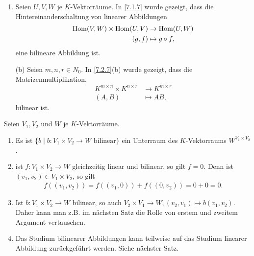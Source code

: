 \documentclass[../../main.tex]{subfiles}
\begin{document}
\begin{bsp}\label{13.2.3}
\begin{enumerate}[\normalfont(a)]
\item Seien $U,V,W$ je $K$-Vektorräume. In \ref{7.1.7} wurde gezeigt, dass die Hintereinanderschaltung von linearer Abbildungen
\begin{align*}
\operatorname{Hom}(V,W)\times \operatorname{Hom}(U,V)&\to\operatorname{Hom}(U,W)\\
(g,f)&\mapsto g\circ f,
\end{align*}		
eine bilineare Abbildung ist.		
\item[(b)]	Seien $m,n,r\in N_0$. In \ref{7.2.7}(b) wurde gezeigt, dass die Matrizenmultiplikation,
\begin{align*}
K^{m\times n}\times K^{n\times r}&\to K^{m\times r}\\
(A,B)&\mapsto AB,
\end{align*}
bilinear ist.
\end{enumerate}
\end{bsp}

\begin{bem} \label{13.2.4}
Seien $V_1,V_2$ und $W$ je $K$-Vektorräume.
\begin{enumerate}[\normalfont(a)]
\item Es ist $\{b\mid b: V_1\times V_2\to W\text{ bilinear}\}$ ein Unterraum des $K$-Vektorraums $W^{V_1\times V_2}$.
\item ist $f: V_1\times V_2\to W$ gleichzeitig linear und bilinear, so gilt $f=0$. Denn ist $(v_1,v_2)\in V_1\times V_2$, so gilt
\begin{align*}
f((v_1,v_2))=f((v_1,0))+f((0,v_2))=0+0=0.
\end{align*}
\item Ist $b: V_1\times V_2\to W$ bilinear, so auch $V_2\times V_1\to W, (v_2,v_1)\mapsto b(v_1,v_2)$. Daher kann man z.B. im nächsten Satz die Rolle von erstem und zweitem Argument vertauschen.
\item Das Studium bilinearer Abbildungen kann teilweise auf das Studium linearer Abbildung zurückgeführt werden. Siehe nächster Satz.
\end{enumerate}
\end{bem}
\end{document}
